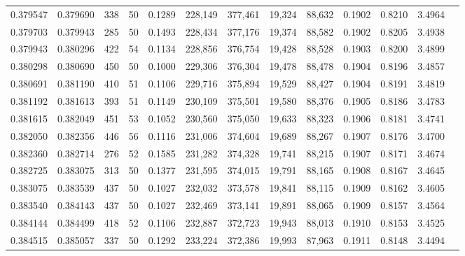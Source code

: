 \begin{tabular}{rrrrrrrrrrrrr}
0.379547 & 0.379690 &   338 &  50 &                                     0.1289 & 228,149 & 377,461 &  19,324 &  88,632 & 0.1902 & 0.8210 & 3.4964 \\
0.379703 & 0.379943 &   285 &  50 &                                     0.1493 & 228,434 & 377,176 &  19,374 &  88,582 & 0.1902 & 0.8205 & 3.4938 \\
0.379943 & 0.380296 &   422 &  54 &                                     0.1134 & 228,856 & 376,754 &  19,428 &  88,528 & 0.1903 & 0.8200 & 3.4899 \\
0.380298 & 0.380690 &   450 &  50 &                                     0.1000 & 229,306 & 376,304 &  19,478 &  88,478 & 0.1904 & 0.8196 & 3.4857 \\
0.380691 & 0.381190 &   410 &  51 &                                     0.1106 & 229,716 & 375,894 &  19,529 &  88,427 & 0.1904 & 0.8191 & 3.4819 \\
0.381192 & 0.381613 &   393 &  51 &                                     0.1149 & 230,109 & 375,501 &  19,580 &  88,376 & 0.1905 & 0.8186 & 3.4783 \\
0.381615 & 0.382049 &   451 &  53 &                                     0.1052 & 230,560 & 375,050 &  19,633 &  88,323 & 0.1906 & 0.8181 & 3.4741 \\
0.382050 & 0.382356 &   446 &  56 &                                     0.1116 & 231,006 & 374,604 &  19,689 &  88,267 & 0.1907 & 0.8176 & 3.4700 \\
0.382360 & 0.382714 &   276 &  52 &                                     0.1585 & 231,282 & 374,328 &  19,741 &  88,215 & 0.1907 & 0.8171 & 3.4674 \\
0.382725 & 0.383075 &   313 &  50 &                                     0.1377 & 231,595 & 374,015 &  19,791 &  88,165 & 0.1908 & 0.8167 & 3.4645 \\
0.383075 & 0.383539 &   437 &  50 &                                     0.1027 & 232,032 & 373,578 &  19,841 &  88,115 & 0.1909 & 0.8162 & 3.4605 \\
0.383540 & 0.384143 &   437 &  50 &                                     0.1027 & 232,469 & 373,141 &  19,891 &  88,065 & 0.1909 & 0.8157 & 3.4564 \\
0.384144 & 0.384499 &   418 &  52 &                                     0.1106 & 232,887 & 372,723 &  19,943 &  88,013 & 0.1910 & 0.8153 & 3.4525 \\
0.384515 & 0.385057 &   337 &  50 &                                     0.1292 & 233,224 & 372,386 &  19,993 &  87,963 & 0.1911 & 0.8148 & 3.4494 \\

\end{tabular}
